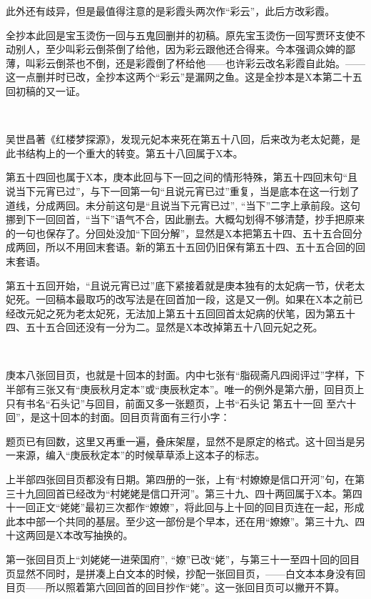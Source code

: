 \par 此外还有歧异，但是最值得注意的是彩霞头两次作“彩云”，此后方改彩霞。
\par 全抄本此回是宝玉烫伤一回与五鬼回删并的初稿。原先宝玉烫伤一回写贾环支使不动别人，至少叫彩云倒茶倒了给他，因为彩云跟他还合得来。今本强调众婢的鄙薄，叫彩云倒茶也不倒，还是彩霞倒了杯给他——也许彩云改名彩霞自此始。——这一点删并时已改，全抄本这两个“彩云”是漏网之鱼。这是全抄本是X本第二十五回初稿的又一证。
\par  
\par 吴世昌著《红楼梦探源》，发现元妃本来死在第五十八回，后来改为老太妃薨，是此书结构上的一个重大的转变。第五十八回属于X本。
\par 第五十四回也属于X本，庚本此回与下一回之间的情形特殊，第五十四回末句“且说当下元宵已过”，与下一回第一句“且说元宵已过”重复，当是底本在这一行划了道线，分成两回。未分前这句是“且说当下元宵已过”, “当下”二字上承前段。这句挪到下一回回首，“当下”语气不合，因此删去。大概勾划得不够清楚，抄手把原来的一句也保存了。分回处没加“下回分解”，显然是X本把第五十四、五十五合回分成两回，所以不用回末套语。新的第五十五回仍旧保有第五十四、五十五合回的回末套语。
\par 第五十五回开始，“且说元宵已过”底下紧接着就是庚本独有的太妃病一节，伏老太妃死。一回稿本最取巧的改写法是在回首加一段，这是又一例。如果在X本之前已经改元妃之死为老太妃死，无法加上第五十五回回首太妃病的伏笔，因为第五十四、五十五合回还没有一分为二。显然是X本改掉第五十八回元妃之死。
\par  
\par 庚本八张回目页，也就是十回本的封面。内中七张有“脂砚斋凡四阅评过”字样，下半部有三张又有“庚辰秋月定本”或“庚辰秋定本”。唯一的例外是第六册，回目页上只有书名“石头记”与回目，前面又多一张题页，上书“石头记 第五十一回 至六十回”，是这十回本的封面。回目页背面有三行小字：
\par 题页已有回数，这里又再重一遍，叠床架屋，显然不是原定的格式。这十回当是另一来源，编入“庚辰秋定本”的时候草草添上这本子的标志。
\par 上半部四张回目页都没有日期。第四册的一张，上有“村嫽嫽是信口开河”句，在第三十九回回首已经改为“村姥姥是信口开河”。第三十九、四十两回属于X本。第四十一回正文“姥姥”最初三次都作“嫽嫽”，将此回与上十回的回目页连在一起，形成此本中部一个共同的基层。至少这一部份是个早本，还在用“嫽嫽”。第三十九、四十这两回是X本改写抽换的。
\par 第一张回目页上“刘姥姥一进荣国府”, “嫽”已改“姥”，与第三十一至四十回的回目页显然不同时，是拼凑上白文本的时候，抄配一张回目页，——白文本本身没有回目页——所以照着第六回回首的回目抄作“姥”。这一张回目页可以撇开不算。
